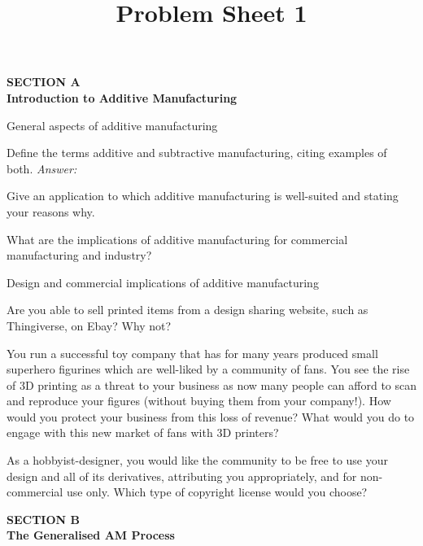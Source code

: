 \documentclass{article}
\title{Problem Sheet 1}
\newcommand\AM{additive manufacturing }
\begin{document}
\vspace{5mm}

\begin{center}
  \large{\bf SECTION A\\[5mm]
    Introduction to Additive Manufacturing}\\[20mm]
\end{center}


\begin{questions}
\item General aspects of \AM
\begin{questions}
 \item Define the terms additive and subtractive manufacturing, citing examples of both. 
 \emph{Answer: }
 \item Give an application to which \AM is well-suited and stating your reasons why. 
 \item What are the implications of \AM for commercial manufacturing and industry? 
 \end{questions}
 \item Design and commercial implications of \AM
\begin{questions}
  \item Are you able to sell printed items from a design sharing website, such as Thingiverse, on Ebay? Why not?
  \item You run a successful toy company that has for many years produced small superhero figurines which are well-liked by a community of fans. You see the rise of 3D printing as a threat to your business as now many people can afford to scan and reproduce your figures (without buying them from your company!). How would you protect your business from this loss of revenue? What would you do to engage with this new market of fans with 3D printers?
  \item As a hobbyist-designer, you would like the community to be free to use your design and all of its derivatives, attributing you appropriately, and for non-commercial use only. Which type of copyright license would you choose?
\end{questions}
\end{questions}

\newpage
\begin{center}
  \large{\bf SECTION B\\[5mm]
    The Generalised AM Process}\\[20mm]
\end{center}
\end{document}
